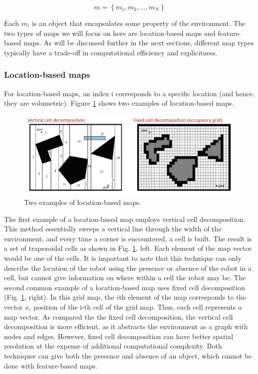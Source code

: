 \documentclass[twoside]{article}
\begin{document}
\begin{equation}
m = \left\{ m _ { 1 } , m _ { 2 } , \ldots , m _ { N } \right\}
\end{equation}

Each $m_i$
is an object that encapsulates some property of the environment. The two types of maps we will
focus on here are location-based maps and feature-based maps. As will be discussed further in the next
sections, different map types typically have a trade-off in computational efficiency and explicitness.

\subsubsection{Location-based maps}

For location-based maps, an index i corresponds to a specific location (and hence, they are volumetric).
Figure \ref{fig:LocationBasedMaps} shows two examples of location-based maps.

\begin{figure}[H]
\centering
\includegraphics[width=.9\linewidth]{LBM.png}
\caption{Two examples of location-based maps.}
\label{fig:LocationBasedMaps}
\end{figure}

The first example of a location-based map employs vertical cell decomposition. This method essentially sweeps a vertical line through the width of the environment, and every time a corner is encountered, a cell is built. The result is a set of trapezoidal cells as shown in Fig. \ref{fig:LocationBasedMaps}, left. Each element of the map vector would be one of the cells. It is important to note that this technique can only describe the location of the robot using the presence or absence of the robot in a cell, but cannot give information on where within a cell the robot may be. The second common example of a location-based map uses fixed cell decomposition (Fig. \ref{fig:LocationBasedMaps}, right). In this grid map, the $i$th element of the map corresponds to the vector $x_i$ position of the i-th cell of the grid map. Thus, each cell represents a map vector. As compared the the fixed cell decomposition, the vertical cell decomposition is more efficient, as it abstracts the environment as a graph with nodes and edges. However, fixed cell decomposition can have better spatial resolution at the expense of additional computational complexity. Both techniques can give both the presence and absence of an object, which cannot be done with feature-based maps.
\end{document}

